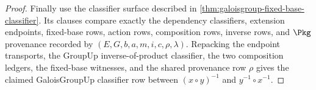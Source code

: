 \begin{proof}
Finally use the classifier surface described in
\autoref{thm:galoisgroup-fixed-base-classifier}. Its clauses compare exactly
the dependency classifiers, extension endpoints, fixed-base rows, action rows,
composition rows, inverse rows, and $\Pkg$ provenance recorded by
$(E,G,b,a,m,i,c,\rho,\lambda)$. Repacking the endpoint transports, the
GroupUp inverse-of-product classifier, the two composition ledgers, the
fixed-base witnesses, and the shared provenance row $\rho$ gives the claimed
GaloisGroupUp classifier row between $(x\circ y)^{-1}$ and
$y^{-1}\circ x^{-1}$.
\end{proof}
